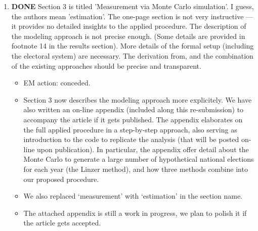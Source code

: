 \documentclass{article}
\begin{document}
\begin{enumerate}
\item {\bfseries\sffamily DONE} Section 3 is titled 'Measurement via Monte Carlo simulation'. I guess, the authors mean 'estimation'. The one-page section is not very instructive --- it provides no detailed insights to the applied procedure. The description of the modeling approach is not precise enough. (Some details are provided in footnote 14 in the results section).  More details of the formal setup (including the electoral system) are necessary. The derivation from, and the combination of the existing approaches should be precise and transparent.
\label{sec:orgheadline26}
\begin{itemize}
\item EM action: conceded.
\item Section 3 now describes the modeling approach more explicitely. We have also written an on-line appendix (included along this re-submission) to accompany the article if it gets published. The appendix elaborates on the full applied procedure in a step-by-step approach, also serving as introduction to the code to replicate the analysis (that will be posted on-line upon publication). In particular, the appendix offer detail about the Monte Carlo to generate a large number of hypothetical national elections for each year (the Linzer method), and how three methods combine into our proposed procedure.
\item We also replaced `measurement' with `estimation' in the section name.
\item The attached appendix is still a work in progress, we plan to polish it if the article gets accepted.
\end{itemize}


\end{enumerate}
\end{document}
